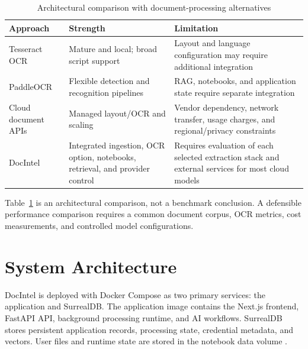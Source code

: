 \documentclass[conference]{IEEEtran}
\begin{document}
\begin{table}[!t]
\centering
\caption{Architectural comparison with document-processing alternatives}
\label{tab:positioning}
\small
\setlength{\tabcolsep}{4pt}
\begin{tabular}{p{}p{}p{}}
\toprule
\rowcolor{docintelLightBlue}
Approach & Strength & Limitation \\
\midrule
Tesseract OCR \cite{tesseract2026} & Mature and local; broad script support & Layout and language configuration may require additional integration \\
PaddleOCR \cite{paddleocr} & Flexible detection and recognition pipelines & RAG, notebooks, and application state require separate integration \\
Cloud document APIs & Managed layout/OCR and scaling & Vendor dependency, network transfer, usage charges, and regional/privacy constraints \\
DocIntel & Integrated ingestion, OCR option, notebooks, retrieval, and provider control & Requires evaluation of each selected extraction stack and external services for most cloud models \\
\bottomrule
\end{tabular}
\end{table}


Table~\ref{tab:positioning} is an architectural comparison, not a benchmark conclusion. A defensible performance comparison requires a common document corpus, OCR metrics, cost measurements, and controlled model configurations.

\section{System Architecture}
DocIntel is deployed with Docker Compose as two primary services: the application and SurrealDB. The application image contains the Next.js frontend, FastAPI API, background processing runtime, and AI workflows. SurrealDB stores persistent application records, processing state, credential metadata, and vectors. User files and runtime state are stored in the notebook data volume \cite{docintel,surrealdb}.
\end{document}
